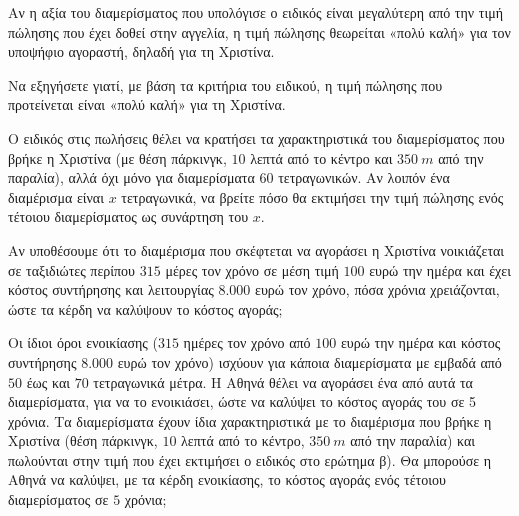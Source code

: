 Αν η αξία του διαμερίσματος που υπολόγισε ο ειδικός είναι μεγαλύτερη από την τιμή πώλησης που έχει δοθεί στην αγγελία, η τιμή πώλησης θεωρείται «πολύ καλή» για τον υποψήφιο αγοραστή, δηλαδή για τη Χριστίνα.

\begin{alist}
\item Να εξηγήσετε γιατί, με βάση τα κριτήρια του ειδικού, η τιμή πώλησης που προτείνεται είναι «πολύ καλή» για τη Χριστίνα.
\item Ο ειδικός στις πωλήσεις θέλει να κρατήσει τα χαρακτηριστικά του διαμερίσματος που βρήκε η Χριστίνα (με θέση πάρκινγκ, $10$ λεπτά από το κέντρο και $350\ m$ από την παραλία), αλλά όχι μόνο για διαμερίσματα $60$ τετραγωνικών. Αν λοιπόν ένα διαμέρισμα είναι $x$ τετραγωνικά, να βρείτε πόσο θα εκτιμήσει την τιμή πώλησης ενός τέτοιου διαμερίσματος ως συνάρτηση του $x$.
\item

\begin{rlist}
\item Αν υποθέσουμε ότι το διαμέρισμα που σκέφτεται να αγοράσει η Χριστίνα νοικιάζεται σε ταξιδιώτες περίπου $315$ μέρες τον χρόνο σε μέση τιμή $100$ ευρώ την ημέρα και έχει κόστος συντήρησης και λειτουργίας $8.000$ ευρώ τον χρόνο, πόσα χρόνια χρειάζονται, ώστε τα κέρδη να καλύψουν το κόστος αγοράς;
\item Οι ίδιοι όροι ενοικίασης ($315$ ημέρες τον χρόνο από $100$ ευρώ την ημέρα και κόστος συντήρησης $8.000$ ευρώ τον χρόνο) ισχύουν για κάποια διαμερίσματα με εμβαδά από $50$ έως και $70$ τετραγωνικά μέτρα. Η Αθηνά θέλει να αγοράσει ένα από αυτά τα διαμερίσματα, για να το ενοικιάσει, ώστε να καλύψει το κόστος αγοράς του σε 5 χρόνια. Τα διαμερίσματα έχουν ίδια χαρακτηριστικά με το διαμέρισμα που βρήκε η Χριστίνα (θέση πάρκινγκ, $10$ λεπτά από το κέντρο, $350\ m$ από την παραλία) και πωλούνται στην τιμή που έχει εκτιμήσει ο ειδικός στο ερώτημα β). Θα μπορούσε η Αθηνά να καλύψει, με τα κέρδη ενοικίασης, το κόστος αγοράς ενός τέτοιου διαμερίσματος σε $5$ χρόνια;
\end{rlist}
\end{alist}

